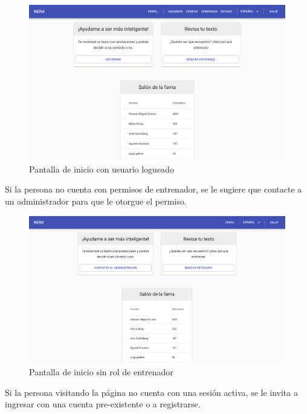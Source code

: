 \documentclass[12pt,a4paper,]{scrartcl}
\begin{document}
\begin{figure}[H]

{\centering \includegraphics{assets/logic/home-logged-all.pdf} 

}

\caption{Pantalla de inicio con usuario logueado}\label{fig:logic-home}
\end{figure}

Si la persona no cuenta con permisos de entrenador, se le sugiere que contacte a un administrador para que le otorgue el permiso.

\begin{figure}[H]

{\centering \includegraphics{assets/logic/home-logged-not_trainer.pdf} 

}

\caption{Pantalla de inicio sin rol de entrenador}\label{fig:logic-home-logged-nontrainer}
\end{figure}

Si la persona visitando la página no cuenta con una sesión activa, se le invita a ingresar con una cuenta pre-existente o a registrarse.
\end{document}

